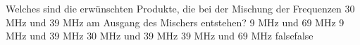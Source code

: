     {Welches sind die erwünschten Produkte, die bei der Mischung der Frequenzen 30 MHz und 39 MHz am Ausgang des Mischers entstehen?}
    {9 MHz und 69 MHz}
    {9 MHz und 39 MHz}
    {30 MHz und 39 MHz}
    {39 MHz und 69 MHz}
    {false}{false}